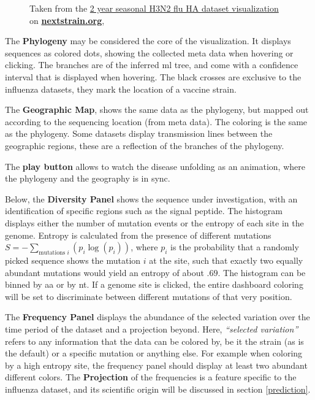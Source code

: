 \documentclass[12pt]{scrartcl}
\begin{document}
  \begin{figure}[h!]
    \caption{\footnotesize Taken from the \href{https://nextstrain.org/flu/seasonal/h3n2/ha/2y?p=grid}{2 year seasonal H3N2 flu HA dataset visualization} on \href{https://nextstrain.org}{\textbf{nextstrain.org}}, \cite{leeMoncla+20}}
  \end{figure}

  The \textbf{Phylogeny} may be considered the core of the visualization. It displays sequences as colored dots, showing the collected meta data when hovering or clicking. The branches are of the inferred \acrshort{ml} tree, and come with a confidence interval that is displayed when hovering. The black crosses are exclusive to the influenza datasets, they mark the location of a vaccine strain.

  The \textbf{Geographic Map}, shows the same data as the phylogeny, but mapped out according to the sequencing location (from meta data). The coloring is the same as the phylogeny. Some datasets display transmission lines between the geographic regions, these are a reflection of the branches of the phylogeny.

  The \textbf{play button} allows to watch the disease unfolding as an animation, where the phylogeny and the geography is in sync.

  Below, the \textbf{Diversity Panel} shows the sequence under investigation, with an identification of specific regions such as the signal peptide. The histogram displays either the number of mutation events or the entropy of each site in the genome. Entropy is calculated from the presence of different mutations $ S = -\sum_{\text{mutations } i}(p_i \log(p_i))$, where $p_i$ is the probability that a randomly picked sequence shows the mutation $i$ at the site, such that exactly two equally abundant mutations would yield an entropy of about $.69$. The histogram can be binned by \acrfull{aa} or by \acrfull{nt}. If a genome site is clicked, the entire dashboard coloring will be set to discriminate between different mutations of that very position.

  The \textbf{Frequency Panel} displays the abundance of the selected variation over the time period of the dataset and a projection beyond. Here, \textit{``selected variation''} refers to any information that the data can be colored by, be it the strain (as is the default) or a specific mutation or anything else. For example when coloring by a high entropy site, the frequency panel should display at least two abundant different colors. The \textbf{Projection} of the frequencies is a feature specific to the influenza dataset, and its scientific origin will be discussed in section \ref{prediction}.
\end{document}
